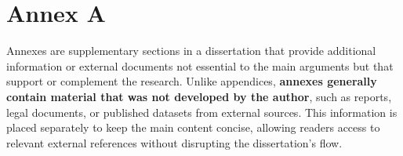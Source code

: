 \chapter{Annex A}
Annexes are supplementary sections in a dissertation that provide additional information or external documents not essential to the main arguments but that support or complement the research. Unlike appendices, \textbf{annexes generally contain material that was not developed by the author}, such as reports, legal documents, or published datasets from external sources. This information is placed separately to keep the main content concise, allowing readers access to relevant external references without disrupting the dissertation's flow.